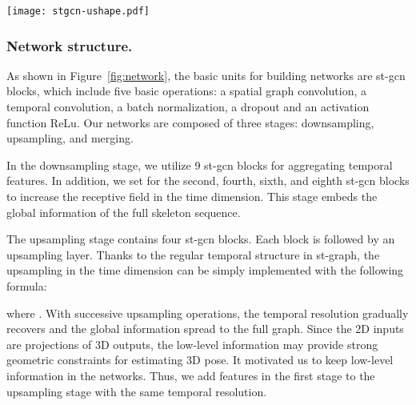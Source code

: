 \documentclass[runningheads]{llncs}
\begin{document}
\begin{figure*}
    \centering
    \texttt{[image: stgcn-ushape.pdf]}
    \caption{\small
    Network structure. We proposed a U-shaped graph convolution network (UGCN) as the backbone of our pose estimation model
    to incorporate both local and global information with a high resolution.
    This network consists of three stages:
    downsampling, upsampling and merging.
    The network first aggregates long-range information by temporal pooling operations in the downsampling stage.
    And then recovers the resolution by upsampling layers.
    To keep the low-level information,
    the features in the downsampling stage are also added to the upsample branch by some shortcuts.
    Finally, the multi-scale feature maps are merged to predicted 3D skeletal joints.
    In this way, UGCN incorporates both short-term and long-term information, making it an ideal fit for the supervision of the motion loss.
    }
\label{fig:network}
\end{figure*}

\subsubsection{Network structure.}

As shown in Figure~\ref{fig:network},
the basic units for building networks are st-gcn blocks,
which include five basic operations:
a spatial graph convolution,
a temporal convolution,
a batch normalization,
a dropout and an activation function ReLu.
Our networks are composed of three stages: downsampling, upsampling, and merging.

In the downsampling stage,
we utilize 9 st-gcn blocks for aggregating temporal features.
In addition, we set  for the second, fourth, sixth, and eighth st-gcn blocks to increase the receptive field in the time dimension.
This stage embeds the global information of the full skeleton sequence.

The upsampling stage contains four st-gcn blocks.
Each block is followed by an upsampling layer.
Thanks to the regular temporal structure in st-graph, the upsampling in the time dimension can be simply implemented with the following
formula:

where .
With successive upsampling operations,
the temporal resolution gradually recovers
and the global information spread to the full graph.
Since the 2D inputs are projections of 3D outputs,
the low-level information may provide strong geometric constraints for estimating 3D pose.
It motivated us to keep low-level information in the networks.
Thus, we add features in the first stage to the upsampling stage with the same temporal resolution.
\end{document}
